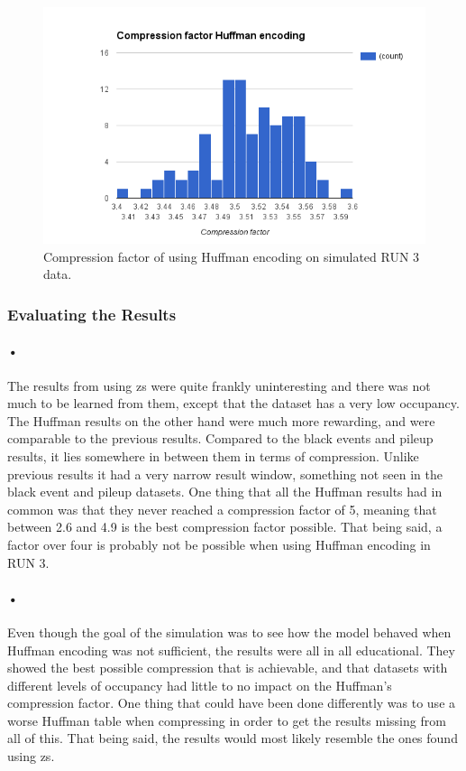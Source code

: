 \documentclass[a4paper, 12pt]{report}
\begin{document}
\begin{figure}[h!]
	\centering
		\includegraphics[width=1.0\textwidth]{images/huffman-comp-fake-pileup.png}
		\caption{Compression factor of using Huffman encoding on simulated RUN 3 data.}
		\label{fig:compression-factor-huffman-synt}
\end{figure}

\subsubsection{Evaluating the Results}

\paragraph{•}
The results from using \gls{zs} were quite frankly uninteresting and there was not much to be learned from them, except that the dataset has a very low occupancy.
The Huffman results on the other hand were much more rewarding, and were comparable to the previous results.
Compared to the black events and pileup results, it lies somewhere in between them in terms of compression.
Unlike previous results it had a very narrow result window, something not seen in the black event and pileup datasets.
One thing that all the Huffman results had in common was that they never reached a compression factor of 5, meaning that between 2.6 and 4.9 is the best compression factor possible.
That being said, a factor over four is probably not be possible when using Huffman encoding in RUN 3.

\paragraph{•}
Even though the goal of the simulation was to see how the model behaved when Huffman encoding was not sufficient, the results were all in all educational.
They showed the best possible compression that is achievable, and that datasets with different levels of occupancy had little to no impact on the Huffman's compression factor.
One thing that could have been done differently was to use a worse Huffman table when compressing in order to get the results missing from all of this.
That being said, the results would most likely resemble the ones found using \gls{zs}.
\end{document}
